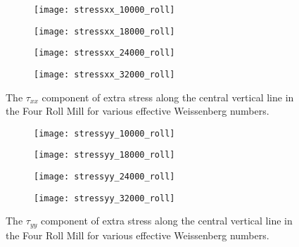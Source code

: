 \begin{figure}[htbp]
	\centering
\begin{subfigure}{0.5\linewidth}
	\texttt{[image: stressxx\_10000\_roll]}
	\label{fig:stressxx_very_low}
\end{subfigure}\hfill
\begin{subfigure}{0.5\linewidth}
	\texttt{[image: stressxx\_18000\_roll]}
	\label{fig:stressxx_low}
\end{subfigure}
\medskip
\begin{subfigure}{0.5\linewidth}
	\texttt{[image: stressxx\_24000\_roll]}
	\label{fig:stressxx_med}
\end{subfigure}\hfill
\begin{subfigure}{0.5\linewidth}
	\texttt{[image: stressxx\_32000\_roll]}
	\label{fig:stressxx_high}
\end{subfigure}
\caption{The $\tau_{xx}$ component of extra stress along the central vertical line in the Four Roll Mill for various effective Weissenberg numbers.}
\label{fig:stressxx_roll_group}
\end{figure}

\begin{figure}[htbp]
	\centering
\begin{subfigure}{0.5\linewidth}
	\texttt{[image: stressyy\_10000\_roll]}
	\label{fig:stressyy_very_low}
\end{subfigure}\hfill
\begin{subfigure}{0.5\linewidth}
	\texttt{[image: stressyy\_18000\_roll]}
	\label{fig:stressyy_low}
\end{subfigure}
\medskip
\begin{subfigure}{0.5\linewidth}
	\texttt{[image: stressyy\_24000\_roll]}
	\label{fig:stressyy_med}
\end{subfigure}\hfill
\begin{subfigure}{0.5\linewidth}
	\texttt{[image: stressyy\_32000\_roll]}
	\label{fig:stressyy_high}
\end{subfigure}
\caption{The $\tau_{yy}$ component of extra stress along the central vertical line in the Four Roll Mill for various effective Weissenberg numbers.}
\label{fig:stressyy_roll_group}
\end{figure}

